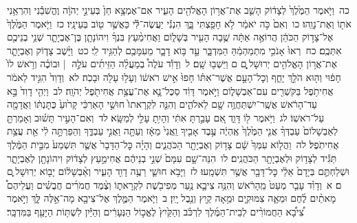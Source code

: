\documentclass[18pt]{article}
\newcommand{\kri}[1]{\Afootnote{#1}}	%
\begin{document}
 {\loc כה~}וַיֹּ֤אמֶר הַמֶּ֙לֶךְ֙ לְצָד֔וֹק הָשֵׁ֛ב אֶת־אֲר֥וֹן הָאֱלֹהִ֖ים הָעִ֑יר אִם־אֶמְצָ֥א חֵן֙ בְּעֵינֵ֣י יְהֹוָ֔ה וֶהֱשִׁבַ֕נִי וְהִרְאַ֥נִי אֹת֖וֹ וְאֶת־נָוֵֽהוּ׃ \startlock
 {\loc כו~}וְאִם֙ כֹּ֣ה יֹאמַ֔ר לֹ֥א חָפַ֖צְתִּי בָּ֑ךְ הִנְנִ֕י יַעֲשֶׂה־לִּ֕י כַּאֲשֶׁ֥ר ט֖וֹב בְּעֵינָֽיו׃ \startlock
 {\loc כז~}וַיֹּ֤אמֶר הַמֶּ֙לֶךְ֙ אֶל־צָד֣וֹק הַכֹּהֵ֔ן הֲרוֹאֶ֣ה אַתָּ֔ה שֻׁ֥בָה הָעִ֖יר בְּשָׁל֑וֹם וַאֲחִימַ֨עַץ בִּנְךָ֜ וִיהוֹנָתָ֧ן בֶּן־אֶבְיָתָ֛ר שְׁנֵ֥י בְנֵיכֶ֖ם אִתְּכֶֽם׃ \startlock
 {\loc כח~}רְאוּ֙ אָנֹכִ֣י מִתְמַהְמֵ֔הַּ  \edtext{(בעברות)}{\kri{קרי: בְּעַֽרְב֖וֹת}}  הַמִּדְבָּ֑ר עַ֣ד בּ֥וֹא דָבָ֛ר מֵעִמָּכֶ֖ם לְהַגִּ֥יד לִֽי׃ \startlock
 {\loc כט~}וַיָּ֨שֶׁב צָד֧וֹק וְאֶבְיָתָ֛ר אֶת־אֲר֥וֹן הָאֱלֹהִ֖ים יְרוּשָׁל ָ֑͏ְם ם וַיֵּשְׁב֖וּ שָֽׁם׃ \startlock
 {\loc ל~}וְדָוִ֡ד עֹלֶה֩ בְמַעֲלֵ֨ה הַזֵּיתִ֜ים עֹלֶ֣ה  |  וּבוֹכֶ֗ה וְרֹ֥אשׁ לוֹ֙ חָפ֔וּי וְה֖וּא הֹלֵ֣ךְ יָחֵ֑ף וְכׇל־הָעָ֣ם אֲשֶׁר־אִתּ֗וֹ חָפוּ֙ אִ֣ישׁ רֹאשׁ֔וֹ וְעָל֥וּ עָלֹ֖ה וּבָכֹֽה׃ \startlock
 {\loc לא~}וְדָוִד֙ הִגִּ֣יד לֵאמֹ֔ר אֲחִיתֹ֥פֶל בַּקֹּשְׁרִ֖ים עִם־אַבְשָׁל֑וֹם וַיֹּ֣אמֶר דָּוִ֔ד סַכֶּל־נָ֛א אֶת־עֲצַ֥ת אֲחִיתֹ֖פֶל יְהֹוָֽה׃ \startlock
 {\loc לב~}וַיְהִ֤י דָוִד֙ בָּ֣א עַד־הָרֹ֔אשׁ אֲשֶֽׁר־יִשְׁתַּחֲוֶ֥ה שָׁ֖ם לֵאלֹהִ֑ים וְהִנֵּ֤ה לִקְרָאתוֹ֙ חוּשַׁ֣י הָאַרְכִּ֔י קָר֙וּעַ֙ כֻּתׇּנְתּ֔וֹ וַאֲדָמָ֖ה עַל־רֹאשֽׁוֹ׃ \startlock
 {\loc לג~}וַיֹּ֥אמֶר ל֖וֹ דָּוִ֑ד אִ֚ם עָבַ֣רְתָּ אִתִּ֔י וְהָיִ֥תָ עָלַ֖י לְמַשָּֽׂא׃ \startlock
 {\loc לד~}וְאִם־הָעִ֣יר תָּשׁ֗וּב וְאָמַרְתָּ֤ לְאַבְשָׁלוֹם֙ עַבְדְּךָ֨ אֲנִ֤י הַמֶּ֙לֶךְ֙ אֶֽהְיֶ֔ה עֶ֣בֶד אָבִ֤יךָ וַֽאֲנִי֙ מֵאָ֔ז וְעַתָּ֖ה וַאֲנִ֣י עַבְדֶּ֑ךָ וְהֵפַרְתָּ֣ה לִ֔י אֵ֖ת עֲצַ֥ת אֲחִיתֹֽפֶל׃ \startlock
 {\loc לה~}וַהֲל֤וֹא עִמְּךָ֙ שָׁ֔ם צָד֥וֹק וְאֶבְיָתָ֖ר הַכֹּהֲנִ֑ים וְהָיָ֗ה כׇּל־הַדָּבָר֙ אֲשֶׁ֤ר תִּשְׁמַע֙ מִבֵּ֣ית הַמֶּ֔לֶךְ תַּגִּ֕יד לְצָד֥וֹק וּלְאֶבְיָתָ֖ר הַכֹּהֲנִֽים׃ \startlock
 {\loc לו~}הִנֵּה־שָׁ֤ם עִמָּם֙ שְׁנֵ֣י בְנֵיהֶ֔ם אֲחִימַ֣עַץ לְצָד֔וֹק וִיהוֹנָתָ֖ן לְאֶבְיָתָ֑ר וּשְׁלַחְתֶּ֤ם בְּיָדָם֙ אֵלַ֔י כׇּל־דָּבָ֖ר אֲשֶׁ֥ר תִּשְׁמָֽעוּ׃ \startlock
 {\loc לז~}וַיָּבֹ֥א חוּשַׁ֛י רֵעֶ֥ה דָוִ֖ד הָעִ֑יר וְאַ֨בְשָׁל֔וֹם יָב֖וֹא יְרֽוּשָׁל ָֽ͏ְם ם׃ 
\startlock
 {\loc א~}וְדָוִ֗ד עָבַ֤ר מְעַט֙ מֵֽהָרֹ֔אשׁ וְהִנֵּ֥ה צִיבָ֛א נַ֥עַר מְפִיבֹ֖שֶׁת לִקְרָאת֑וֹ וְצֶ֨מֶד חֲמֹרִ֜ים חֲבֻשִׁ֗ים וַעֲלֵיהֶם֩ מָאתַ֨יִם לֶ֜חֶם וּמֵאָ֧ה צִמּוּקִ֛ים וּמֵ֥אָה קַ֖יִץ וְנֵ֥בֶל יָֽיִן׃ \startlock
 {\loc ב~}וַיֹּ֧אמֶר הַמֶּ֛לֶךְ אֶל־צִיבָ֖א מָה־אֵ֣לֶּה לָּ֑ךְ וַיֹּ֣אמֶר צִ֠יבָ֠א הַחֲמוֹרִ֨ים לְבֵית־הַמֶּ֜לֶךְ לִרְכֹּ֗ב  \edtext{(ולהלחם)}{\kri{קרי: וְהַלֶּ֤חֶם}}  וְהַקַּ֙יִץ֙ לֶאֱכ֣וֹל הַנְּעָרִ֔ים וְהַיַּ֕יִן לִשְׁתּ֥וֹת הַיָּעֵ֖ף בַּמִּדְבָּֽר׃ \startlock
\end{document}
